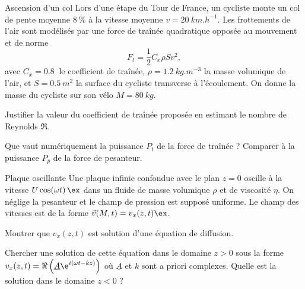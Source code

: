 \begin{exo}[PC][1][TD]{Ascension d'un col}
Lors d'une étape du Tour de France, un cycliste monte un col de pente moyenne $\SI{8}{\%}$ à la vitesse moyenne $v=\SI{20}{km.h^{-1}}$.
Les frottements de l'air sont modélisés par une force de traînée quadratique opposée au mouvement et de norme
$$
F_t = \frac{1}{2} C_x \rho S v^2,
$$
avec $C_x=\SI{0.8}{}$ le coefficient de traînée, $\rho = \SI{1.2}{kg.m^{-3}}$ la masse volumique de l'air, et $S=\SI{0.5}{m^2}$ la surface du cycliste transverse à l'écoulement. On donne la masse du cycliste sur son vélo $M=\SI{80}{kg}$.
 \begin{quest}
   \item Justifier la valeur du coefficient de traînée proposée en estimant le nombre de Reynolds $\Re$.
\item Que vaut numériquement la puissance $P_t$ de la force de traînée ?
Comparer à la puissance $P_p$ de la force de pesanteur.
\end{quest}
\end{exo}


\begin{exo}[PC]{Plaque oscillante}
Une plaque infinie confondue avec le plan $z=0$ oscille à la vitesse $U\cos(\omega t)\,\ex$ dans un fluide de masse volumique $\rho$ et de viscosité $\eta$. On néglige la pesanteur et le champ de pression est supposé uniforme. Le champ des vitesses est de la forme $\Vec{v}(M,t)=v_x(z,t)\ex$.
\begin{quest}
\item Montrer que $v_x(z,t)$ est solution d'une équation de diffusion.
\item Chercher une solution de cette équation dans le domaine $z>0$ sous la forme $v_x(z,t)=\Re\left(\underline{A}\e^{i(\omega t-kz)}\right)$ où $\underline{A}$ et $k$ sont a priori complexes. Quelle est la solution dans le domaine $z<0$ ?
\end{quest}
\end{exo}


